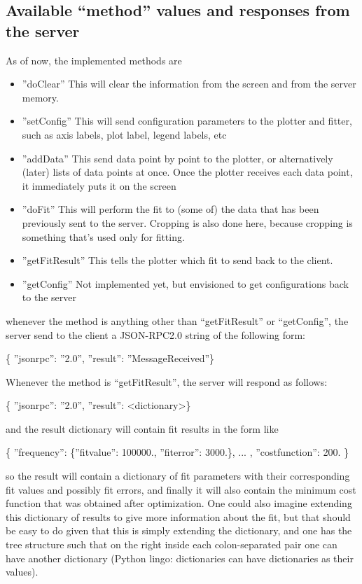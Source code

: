 \documentclass[11pt]{article} %
\begin{document}
\subsection{Available ``method'' values and responses from the server}

As of now, the implemented methods are 
\begin{itemize}
\item { {''}doClear{''}} This will clear the information from the screen and from the server memory. 
\item { {''}setConfig{''}} This will send configuration parameters to the plotter and fitter, such as axis labels, plot label, legend labels, etc
\item { {''}addData{''}} This send data point by point to the plotter, or alternatively (later) lists of data points at once. Once the plotter receives each data point, it immediately puts it on the screen
\item { {''}doFit{''}} This will perform the fit to (some of) the data that has been previously sent to the server. Cropping is also done here, because cropping is something that's used only for fitting. 
\item { {''}getFitResult{''}} This tells the plotter which fit to send back to the client. 
\item { {''}getConfig{''}} Not implemented yet, but envisioned to get configurations back to the server
\end{itemize}

whenever the method is anything other than ``getFitResult'' or ``getConfig'', the server send to the client a JSON-RPC2.0 string of the following form: 

{ \{ {''}jsonrpc{''}: {''}2.0{''}, {''}result{''}: {''}MessageReceived{''}\}}

Whenever the method is ``getFitResult'', the server will respond as follows: 

{ \{ {''}jsonrpc{''}: {''}2.0{''}, {''}result{''}: <dictionary>\}}

and the result dictionary will contain fit results in the form like 

{ \{ {''}frequency{''}: \{{''}fitvalue{''}: 100000., {''}fiterror{''}: 3000.\}, ... , {''}costfunction{''}: 200. \}}

so the result will contain a dictionary of fit parameters with their corresponding fit values and possibly fit errors, and finally it will also contain the minimum cost function that was obtained after optimization.  One could also imagine extending this dictionary of results to give more information about the fit, but that should be easy to do given that this is simply extending the dictionary, and one has the tree structure such that on the right inside each colon-separated pair one can have another dictionary (Python lingo: dictionaries can have dictionaries as their values). 
\end{document}
